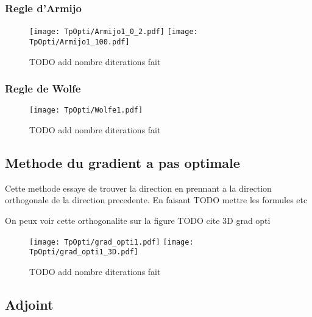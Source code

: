 \subsubsection{Regle d'Armijo}
\begin{figure}[H]
    \centering
    \texttt{[image: TpOpti/Armijo1\_0\_2.pdf]}
    \texttt{[image: TpOpti/Armijo1\_100.pdf]}
    \caption{TODO add nombre diterations fait}
\end{figure}

\subsubsection{Regle de Wolfe}
\begin{figure}[H]
    \centering
    \texttt{[image: TpOpti/Wolfe1.pdf]}
    \caption{TODO add nombre diterations fait}
\end{figure}

\subsection{Methode du gradient a pas optimale}
Cette methode essaye de trouver la direction en prennant a la direction orthogonale de la direction precedente. En faisant TODO mettre les formules etc 

On peux voir cette orthogonalite sur la figure TODO cite 3D grad opti

\begin{figure}[H]
    \centering
    \texttt{[image: TpOpti/grad\_opti1.pdf]}
    \texttt{[image: TpOpti/grad\_opti1\_3D.pdf]}  
    \caption{TODO add nombre diterations fait}
\end{figure}
\subsection{Adjoint}